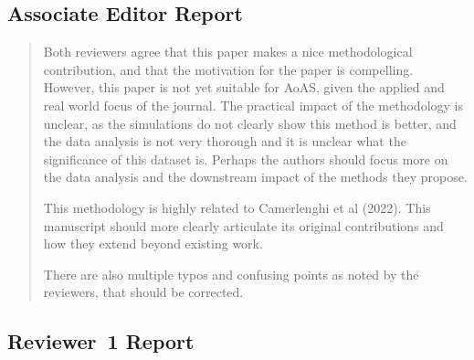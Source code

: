 \subsection{Associate Editor Report}
\label{app:ae}

\begin{quote}
\small
Both reviewers agree that this paper makes a nice methodological
contribution, and that the motivation for the paper is compelling.
However, this paper is not yet suitable for AoAS, given the applied
and real world focus of the journal. The practical impact of the
methodology is unclear, as the simulations do not clearly show this
method is better, and the data analysis is not very thorough and it
is unclear what the significance of this dataset is. Perhaps the
authors should focus more on the data analysis and the downstream
impact of the methods they propose.

This methodology is highly related to Camerlenghi et al (2022). This
manuscript should more clearly articulate its original contributions
and how they extend beyond existing work.

There are also multiple typos and confusing points as noted by the
reviewers, that should be corrected.
\end{quote}


\subsection{Reviewer~1 Report}
\label{app:r1}

